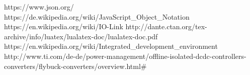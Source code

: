 https://www.json.org/
https://de.wikipedia.org/wiki/JavaScript_Object_Notation
https://en.wikipedia.org/wiki/IO-Link
http://dante.ctan.org/tex-archive/info/luatex/lualatex-doc/lualatex-doc.pdf
https://en.wikipedia.org/wiki/Integrated_development_environment
http://www.ti.com/de-de/power-management/offline-isolated-dcdc-controllers-converters/flybuck-converters/overview.html#
